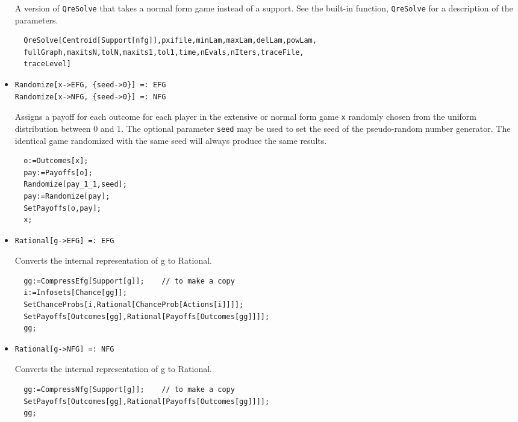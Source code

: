 \begin{itemize}
\bd 
A version of \verb+QreSolve+ that takes a normal form
game instead of a support.  See the built-in function,
\verb+QreSolve+ for a description of the parameters.
\begin{verbatim}
  QreSolve[Centroid[Support[nfg]],pxifile,minLam,maxLam,delLam,powLam,
  fullGraph,maxitsN,tolN,maxits1,tol1,time,nEvals,nIters,traceFile,
  traceLevel]
\end{verbatim} 
\ed


\item{}
\protect \large \begin{verbatim}
Randomize[x->EFG, {seed->0}] =: EFG 
Randomize[x->NFG, {seed->0}] =: NFG 
\end{verbatim}\normalsize

\bd 
Assigns a payoff for each outcome for each player in the extensive
or normal form game \verb+x+ randomly chosen from the uniform
distribution between 0 and 1.  The optional parameter \verb+seed+ may
be used to set the seed of the pseudo-random number generator.  The
identical game randomized with the same seed will always produce the
same results.
\begin{verbatim}
  o:=Outcomes[x];
  pay:=Payoffs[o];
  Randomize[pay_1_1,seed];
  pay:=Randomize[pay];
  SetPayoffs[o,pay];
  x;
\end{verbatim} 
\ed

\item{}
\protect \large \begin{verbatim}
Rational[g->EFG] =: EFG 
\end{verbatim}\normalsize

\bd 
Converts the internal representation of g to Rational.  
\begin{verbatim}
  gg:=CompressEfg[Support[g]];    // to make a copy
  i:=Infosets[Chance[gg]];
  SetChanceProbs[i,Rational[ChanceProb[Actions[i]]]];
  SetPayoffs[Outcomes[gg],Rational[Payoffs[Outcomes[gg]]]];
  gg;
\end{verbatim} 
\ed

\item{}
\protect \large \begin{verbatim}
Rational[g->NFG] =: NFG 
\end{verbatim}\normalsize

\bd 
Converts the internal representation of g to Rational.  
\begin{verbatim}
  gg:=CompressNfg[Support[g]];    // to make a copy
  SetPayoffs[Outcomes[gg],Rational[Payoffs[Outcomes[gg]]]];
  gg;
\end{verbatim} 
\ed


\end{itemize}
